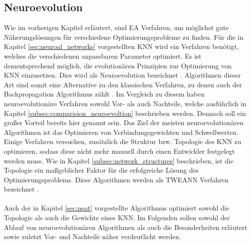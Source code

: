 \subsection{Neuroevolution}
\label{subsec:neuroevolution}
Wie im vorherigen Kapitel erläutert, sind \ac{EA} Verfahren, um möglichst gute Näherungslösungen für verschiedene Optimierungsprobleme zu finden. Für die in Kapitel \ref{sec:neuroal_networks} vorgestellten \ac{KNN} wird ein Verfahren benötigt, welches die verschiedenen anpassbaren Parameter optimiert. Es ist dementsprechend möglich, die evolutionären Prinzipien zur Optimierung von \ac{KNN} einzusetzen. Dies wird als Neuroevolution bezeichnet \cite{meisner2009neurostrategies}. Algorithmen dieser Art sind somit eine Alternative zu den klassischen Verfahren, zu denen auch der Backpropagation Algorithmus zählt \cite{whitley1993genetic}. Im Vergleich zu diesem haben neuroevolutionäre Verfahren sowohl Vor- als auch Nachteile, welche ausführlich in Kapitel \ref{subsec:comparision_neuroevoltion} beschrieben werden. Dennoch soll ein großer Vorteil bereits hier genannt sein. Das Ziel der meisten neuroevolutionären Algorithmen ist das Optimieren von Verbindungsgewichten und Schwellwerten. Einige Verfahren versuchen, zusätzlich die Struktur bzw. Topologie des \ac{KNN} zu optimieren, sodass diese nicht mehr manuell durch einen Entwickler festgelegt werden muss. Wie in Kapitel \ref{subsec:network_structures} beschrieben, ist die Topologie ein maßgeblicher Faktor für die erfolgreiche Lösung des Optimierungsproblems. Diese Algorithmen werden als \ac{TWEANN} Verfahren bezeichnet \cite{stanley2002evolving}. 
\\\\
Auch der in Kapitel \ref{sec:neat} vorgestellte Algorithmus optimiert sowohl die Topologie als auch die Gewichte eines \ac{KNN}. Im Folgenden sollen sowohl der Ablauf von neuroevolutionären Algorithmen als auch die Besonderheiten erläutert sowie zuletzt Vor- und Nachteile näher verdeutlicht werden.

